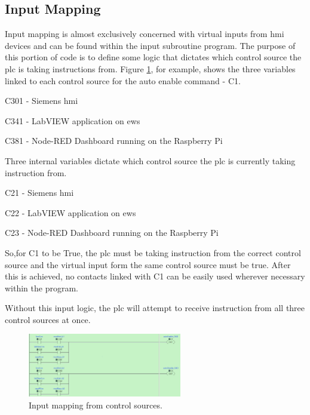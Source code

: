     \subsection{Input Mapping} \label{sec:input}
        Input mapping is almost exclusively concerned with virtual inputs from \acrshort{hmi} devices and can be found within the input subroutine program. The purpose of this portion of code is to define some logic that dictates which control source the \acrshort{plc} is taking instructions from. Figure \ref{fig:inputMapping}, for example, shows the three variables linked to each control source for the auto enable command - C1.
        \begin{description}
            \item C301 - Siemens \acrshort{hmi}
            \item C341 - LabVIEW application on \acrshort{ews} 
            \item C381 - Node-RED Dashboard running on the Raspberry Pi
        \end{description}
        
        Three internal variables dictate which control source the \acrshort{plc} is currently taking instruction from.
        \begin{description}
            \item C21 - Siemens \acrshort{hmi}
            \item C22 - LabVIEW application on \acrshort{ews}
            \item C23 - Node-RED Dashboard running on the Raspberry Pi
        \end{description} 
        So,for C1 to be True, the \acrshort{plc} must be taking instruction from the correct control source and the virtual input form the same control source must be true. After this is achieved, \acrshort{no} contacts linked with C1 can be easily used wherever necessary within the program. 

        Without this input logic, the \acrshort{plc} will attempt to receive instruction from all three control sources at once.
        
        \begin{figure}[H]
            \centering
            \includegraphics[width = 0.6\textwidth]{2_images/inputMapping}
            \caption{Input mapping from control sources.}
            \label{fig:inputMapping}
        \end{figure}
        
